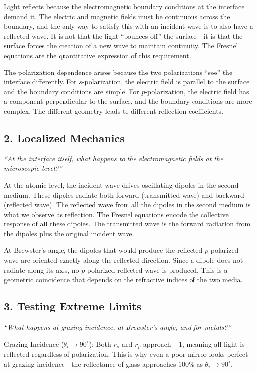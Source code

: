 \documentclass[11pt,openright]{book}
\begin{document}
Light reflects because the electromagnetic boundary conditions at the interface demand it. The electric and magnetic fields must be continuous across the boundary, and the only way to satisfy this with an incident wave is to also have a reflected wave. It is not that the light ``bounces off'' the surface---it is that the surface forces the creation of a new wave to maintain continuity. The Fresnel equations are the quantitative expression of this requirement.

The polarization dependence arises because the two polarizations ``see'' the interface differently. For $s$-polarization, the electric field is parallel to the surface and the boundary conditions are simple. For $p$-polarization, the electric field has a component perpendicular to the surface, and the boundary conditions are more complex. The different geometry leads to different reflection coefficients.

\subsection*{2. Localized Mechanics}
\textit{``At the interface itself, what happens to the electromagnetic fields at the microscopic level?''}

At the atomic level, the incident wave drives oscillating dipoles in the second medium. These dipoles radiate both forward (transmitted wave) and backward (reflected wave). The reflected wave from all the dipoles in the second medium is what we observe as reflection. The Fresnel equations encode the collective response of all these dipoles. The transmitted wave is the forward radiation from the dipoles plus the original incident wave.

At Brewster's angle, the dipoles that would produce the reflected $p$-polarized wave are oriented exactly along the reflected direction. Since a dipole does not radiate along its axis, no $p$-polarized reflected wave is produced. This is a geometric coincidence that depends on the refractive indices of the two media.

\subsection*{3. Testing Extreme Limits}
\textit{``What happens at grazing incidence, at Brewster's angle, and for metals?''}

Grazing Incidence ($\theta_i \to 90^\circ$): Both $r_s$ and $r_p$ approach $-1$, meaning all light is reflected regardless of polarization. This is why even a poor mirror looks perfect at grazing incidence---the reflectance of glass approaches $100\%$ as $\theta_i \to 90^\circ$.
\end{document}
